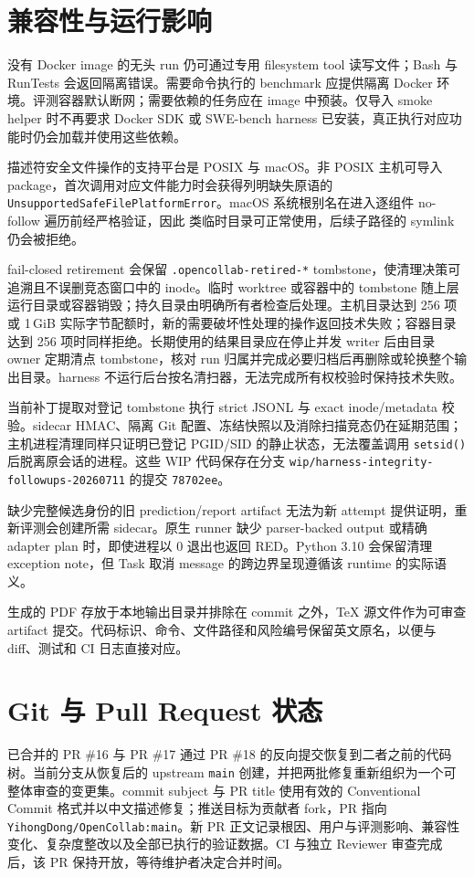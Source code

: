 \documentclass[11pt,a4paper,fontset=fandol]{ctexart}
\newcommand{\code}[1]{\texttt{#1}}
\begin{document}
\section{兼容性与运行影响}

没有 Docker image 的无头 run 仍可通过专用 filesystem tool 读写文件；Bash 与 RunTests 会返回隔离错误。需要命令执行的 benchmark 应提供隔离 Docker 环境。评测容器默认断网；需要依赖的任务应在 image 中预装。仅导入 smoke helper 时不再要求 Docker SDK 或 SWE-bench harness 已安装，真正执行对应功能时仍会加载并使用这些依赖。

描述符安全文件操作的支持平台是 POSIX 与 macOS。非 POSIX 主机可导入 package，首次调用对应文件能力时会获得列明缺失原语的 \code{UnsupportedSafeFilePlatformError}。macOS 系统根别名在进入逐组件 no-follow 遍历前经严格验证，因此  类临时目录可正常使用，后续子路径的 symlink 仍会被拒绝。

fail-closed retirement 会保留 \code{.opencollab-retired-*} tombstone，使清理决策可追溯且不误删竞态窗口中的 inode。临时 worktree 或容器中的 tombstone 随上层运行目录或容器销毁；持久目录由明确所有者检查后处理。主机目录达到 256 项或 1\,GiB 实际字节配额时，新的需要破坏性处理的操作返回技术失败；容器目录达到 256 项时同样拒绝。长期使用的结果目录应在停止并发 writer 后由目录 owner 定期清点 tombstone，核对 run 归属并完成必要归档后再删除或轮换整个输出目录。harness 不运行后台按名清扫器，无法完成所有权校验时保持技术失败。

当前补丁提取对登记 tombstone 执行 strict JSONL 与 exact inode/metadata 校验。sidecar HMAC、隔离 Git 配置、冻结快照以及消除扫描竞态仍在延期范围；主机进程清理同样只证明已登记 PGID/SID 的静止状态，无法覆盖调用 \code{setsid()} 后脱离原会话的进程。这些 WIP 代码保存在分支 \code{wip/harness-integrity-followups-20260711} 的提交 \code{78702ee}。

缺少完整候选身份的旧 prediction/report artifact 无法为新 attempt 提供证明，重新评测会创建所需 sidecar。原生 runner 缺少 parser-backed output 或精确 adapter plan 时，即使进程以 0 退出也返回 RED。Python 3.10 会保留清理 exception note，但 Task 取消 message 的跨边界呈现遵循该 runtime 的实际语义。

生成的 PDF 存放于本地输出目录并排除在 commit 之外，TeX 源文件作为可审查 artifact 提交。代码标识、命令、文件路径和风险编号保留英文原名，以便与 diff、测试和 CI 日志直接对应。

\section{Git 与 Pull Request 状态}

已合并的 PR \#16 与 PR \#17 通过 PR \#18 的反向提交恢复到二者之前的代码树。当前分支从恢复后的 upstream \code{main} 创建，并把两批修复重新组织为一个可整体审查的变更集。commit subject 与 PR title 使用有效的 Conventional Commit 格式并以中文描述修复；推送目标为贡献者 fork，PR 指向 \code{YihongDong/OpenCollab:main}。新 PR 正文记录根因、用户与评测影响、兼容性变化、复杂度整改以及全部已执行的验证数据。CI 与独立 Reviewer 审查完成后，该 PR 保持开放，等待维护者决定合并时间。
\end{document}
